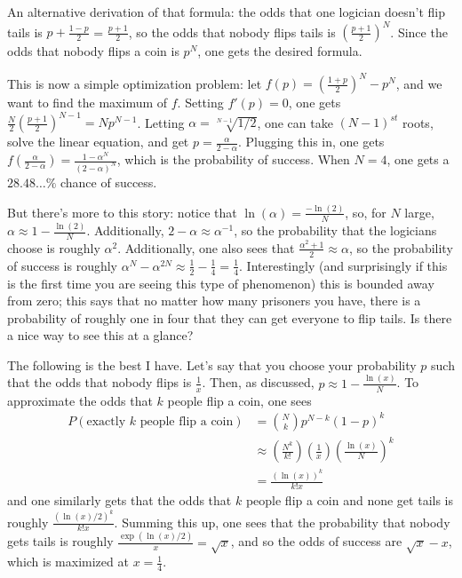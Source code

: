 \documentclass[11pt]{article}
\theoremstyle{definition}
\begin{document}
An alternative derivation of that formula: the odds that one logician doesn't flip tails is $p + \frac{1-p}{2}$ = $\frac{p+1}{2}$, so the odds that nobody flips tails is $\left(\frac{p+1}{2}\right)^N$.  Since the odds that nobody flips a coin is $p^N$, one gets the desired formula.

This is now a simple optimization problem: let $f(p) = \left(\frac{1+p}{2}\right)^N - p^N$, and we want to find the maximum of $f$.  Setting $f'(p) = 0$, one gets $\frac{N}{2}\left(\frac{p+1}{2}\right)^{N-1} = Np^{N-1}$.  Letting $\alpha = \sqrt[N-1]{1/2}$, one can take $(N-1)^{st}$ roots, solve the linear equation, and get $p = \frac{\alpha}{2-\alpha}$.  Plugging this in, one gets $\displaystyle{f\left(\frac{\alpha}{2-\alpha}\right) = \frac{1-\alpha^N}{(2-\alpha)^N}}$, which is the probability of success.  When $N = 4$, one gets a $28.48\ldots\%$ chance of success.

But there's more to this story: notice that $\ln(\alpha) = \frac{-\ln(2)}{N}$, so, for $N$ large, $\alpha \approx 1-\frac{\ln(2)}{N}$.  Additionally, $2-\alpha \approx \alpha^{-1}$, so the probability that the logicians choose is roughly $\alpha^2$.  Additionally, one also sees that $\frac{\alpha^2 + 1}{2} \approx \alpha$, so the probability of success is roughly $\alpha^N - \alpha^{2N} \approx \frac{1}{2} - \frac{1}{4} = \frac{1}{4}$.  Interestingly (and surprisingly if this is the first time you are seeing this type of phenomenon) this is bounded away from zero; this says that no matter how many prisoners you have, there is a probability of roughly one in four that they can get everyone to flip tails.  Is there a nice way to see this at a glance?

The following is the best I have.  Let's say that you choose your probability $p$ such that the odds that nobody flips is $\frac{1}{x}$.  Then, as discussed, $p \approx 1-\frac{\ln(x)}{N}$.  To approximate the odds that $k$ people flip a coin, one sees
\begin{align*}
P(\text{exactly }k\text{ people flip a coin}) & = \binom{N}{k} p^{N-k}(1-p)^k \\
& \approx \left(\frac{N^k}{k!}\right)\left(\frac{1}{x}\right)\left(\frac{\ln(x)}{N}\right)^k \\
& = \frac{(\ln(x))^k}{k!x}
\end{align*}
and one similarly gets that the odds that $k$ people flip a coin and none get tails is roughly $\frac{(\ln(x)/2)^k}{k!x}$.  Summing this up, one sees that the probability that nobody gets tails is roughly $\frac{\exp(\ln(x)/2)}{x} = \sqrt{x}$, and so the odds of success are $\sqrt{x}-x$, which is maximized at $x = \frac{1}{4}$.
\end{document}
